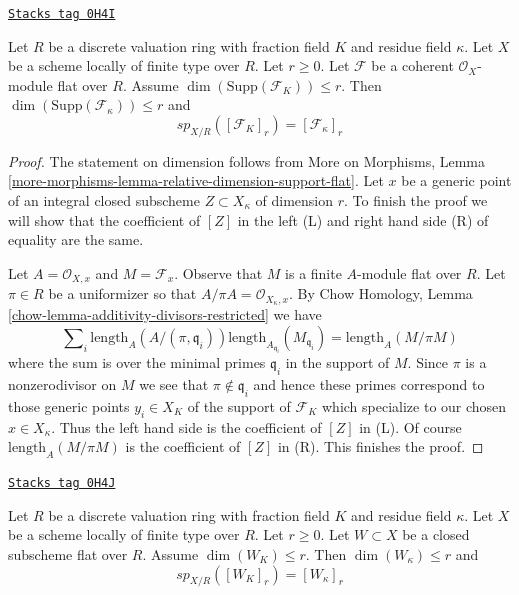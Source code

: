\begin{lemma}
\label{relative-cycles-lemma-specialization-module}
\href{https://stacks.math.columbia.edu/tag/0H4I}{\texttt{Stacks tag 0H4I}}

Let $R$ be a discrete valuation ring with fraction field $K$ and residue field
$\kappa$. Let $X$ be a scheme locally of finite type over $R$. Let $r \geq 0$.
Let $\mathcal{F}$ be a coherent $\mathcal{O}_X$-module flat over $R$. Assume
$\dim(\text{Supp}(\mathcal{F}_K)) \leq r$. Then
$\dim(\text{Supp}(\mathcal{F}_\kappa)) \leq r$ and
$$
sp_{X/R}([\mathcal{F}_K]_r) = [\mathcal{F}_\kappa]_r
$$
\end{lemma}

\begin{proof}
The statement on dimension follows from More on Morphisms, Lemma
\ref{more-morphisms-lemma-relative-dimension-support-flat}.
Let $x$ be a generic point of an integral closed subscheme
$Z \subset X_\kappa$ of dimension $r$. To finish the proof
we will show that the coefficient of $[Z]$
in the left (L) and right hand side (R) of equality are the same.

\medskip\noindent
Let $A = \mathcal{O}_{X, x}$ and $M = \mathcal{F}_x$.
Observe that $M$ is a finite $A$-module flat over $R$.
Let $\pi \in R$ be a uniformizer so that
$A/\pi A = \mathcal{O}_{X_\kappa, x}$.
By Chow Homology, Lemma \ref{chow-lemma-additivity-divisors-restricted}
we have
$$
\sum\nolimits_i \text{length}_A(A/(\pi, \mathfrak q_i))
\text{length}_{A_{\mathfrak q_i}}(M_{\mathfrak q_i}) =
\text{length}_A(M/\pi M)
$$
where the sum is over the minimal primes
$\mathfrak q_i$ in the support of $M$.
Since $\pi$ is a nonzerodivisor on $M$ we see
that $\pi \not \in \mathfrak q_i$ and hence
these primes correspond to those generic points $y_i \in X_K$ of the
support of $\mathcal{F}_K$ which specialize to our chosen $x \in X_\kappa$.
Thus the left hand side is the coefficient of $[Z]$
in (L). Of course $\text{length}_A(M/\pi M)$ is the coefficient
of $[Z]$ in (R). This finishes the proof.
\end{proof}

\begin{lemma}
\label{relative-cycles-lemma-specialization-closed}
\href{https://stacks.math.columbia.edu/tag/0H4J}{\texttt{Stacks tag 0H4J}}

Let $R$ be a discrete valuation ring with fraction field $K$ and residue field
$\kappa$. Let $X$ be a scheme locally of finite type over $R$. Let $r \geq 0$.
Let $W \subset X$ be a closed subscheme flat over $R$. Assume
$\dim(W_K) \leq r$. Then $\dim(W_\kappa) \leq r$ and
$$
sp_{X/R}([W_K]_r) = [W_\kappa]_r
$$
\end{lemma}

